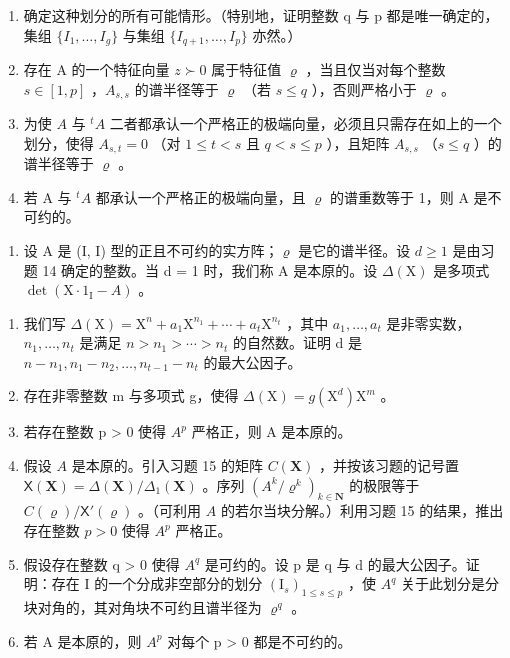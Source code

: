 \begin{enumerate}
\def\labelenumi{\alph{enumi})}
\setcounter{enumi}{1}
\item
  确定这种划分的所有可能情形。（特别地，证明整数 q 与 p 都是唯一确定的，集组 \(\{I_{1},\ldots,I_{g}\}\) 与集组 \(\{I_{q+1},\ldots,I_{p}\}\) 亦然。）
\item
  存在 A 的一个特征向量 \(z \succ 0\) 属于特征值 \(\varrho\) ，当且仅当对每个整数 \(s \in [1, p]\) ，\(A_{s,s}\) 的谱半径等于 \(\varrho\) （若 \(s \leqslant q\) ），否则严格小于 \(\varrho\) 。
\item
  为使 \(A\) 与 \({}^t A\) 二者都承认一个严格正的极端向量，必须且只需存在如上的一个划分，使得 \(A_{s,t} = 0\) （对 \(1 \leqslant t < s\) 且 \(q < s \leqslant p\) ），且矩阵 \(A_{s,s}\) （\(s \leqslant q\) ）的谱半径等于 \(\varrho\) 。
\item
  若 A 与 \(^{t}A\) 都承认一个严格正的极端向量，且 \(\varrho\) 的谱重数等于 1，则 A 是不可约的。
\end{enumerate}

\begin{enumerate}
\def\labelenumi{\arabic{enumi})}
\setcounter{enumi}{21}
\tightlist
\item
  设 A 是 (I, I) 型的正且不可约的实方阵；\(\varrho\) 是它的谱半径。设 \(d \geqslant 1\) 是由习题 14 确定的整数。当 d = 1 时，我们称 A 是本原的。设 \(\Delta(\mathrm{X})\) 是多项式 \(\det(\mathrm{X} \cdot 1_{\mathrm{I}} - A)\) 。
\end{enumerate}

\begin{enumerate}
\def\labelenumi{\alph{enumi})}
\item
  我们写 \(\Delta(\mathrm{X}) = \mathrm{X}^{n} + a_{1}\mathrm{X}^{n_{1}} + \cdots + a_{t}\mathrm{X}^{n_{t}}\) ，其中 \(a_{1}, \ldots, a_{t}\) 是非零实数，\(n_{1}, \ldots, n_{t}\) 是满足 \(n > n_{1} > \cdots > n_{t}\) 的自然数。证明 d 是 \(n - n_{1}, n_{1} - n_{2}, \ldots, n_{t-1} - n_{t}\) 的最大公因子。
\item
  存在非零整数 m 与多项式 g，使得 \(\Delta(\mathrm{X}) = g(\mathrm{X}^{d})\mathrm{X}^{m}\) 。
\item
  若存在整数 p \textgreater{} 0 使得 \(A^{p}\) 严格正，则 A 是本原的。
\item
  假设 \(A\) 是本原的。引入习题 15 的矩阵 \(C(\mathbf{X})\) ，并按该习题的记号置 \(\mathsf{X}(\mathbf{X}) = \Delta (\mathbf{X}) / \Delta_1(\mathbf{X})\) 。序列 \((A^k /\varrho^k)_{k\in \mathbf{N}}\) 的极限等于 \(C(\varrho) / \mathsf{X}'(\varrho)\) 。（可利用 \(A\) 的若尔当块分解。）利用习题 15 的结果，推出存在整数 \(p > 0\) 使得 \(A^p\) 严格正。
\item
  假设存在整数 q \textgreater{} 0 使得 \(A^{q}\) 是可约的。设 p 是 q 与 d 的最大公因子。证明：存在 I 的一个分成非空部分的划分 \((\mathrm{I}_{s})_{1 \leqslant s \leqslant p}\) ，使 \(A^{q}\) 关于此划分是分块对角的，其对角块不可约且谱半径为 \(\varrho^{q}\) 。
\item
  若 A 是本原的，则 \(A^{p}\) 对每个 p \textgreater{} 0 都是不可约的。
\end{enumerate}


